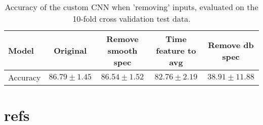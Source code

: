 \documentclass[preprint,NumberedRefs]{JASA}
\begin{document}
\begin{table}[ht]
        \caption{\label{tab:baselining_results} Accuracy of the custom CNN when 'removing' inputs, evaluated on the 10-fold cross validation test data.}
    
        \begin{ruledtabular}
        \begin{tabular}{l|cccc}
         Model & Original & Remove smooth spec & Time feature to avg & Remove db spec \\
        \hline
        Accuracy &  $86.79 \pm 1.45$ & $86.54 \pm 1.52$ & $82.76 \pm 2.19$ & $38.91 \pm 11.88$
        \end{tabular}
        \end{ruledtabular}
\end{table}

\FloatBarrier

\section{refs}

%
\end{document}
